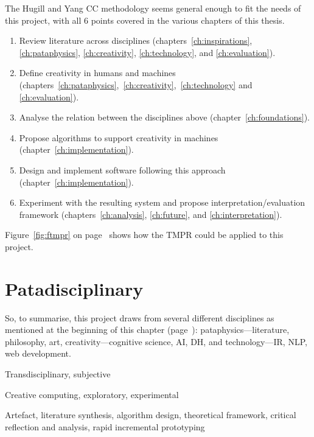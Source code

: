 The Hugill and Yang \ac{CC} methodology seems general enough to fit the needs of this project, with all 6 points covered in the various chapters of this thesis.

\begin{enumerate}
  \item Review literature across disciplines (chapters~\ref{ch:inspirations}, \ref{ch:pataphysics}, \ref{ch:creativity}, \ref{ch:technology}, and \ref{ch:evaluation}).
  \item Define creativity in humans and machines (chapters~\ref{ch:pataphysics},~\ref{ch:creativity},~\ref{ch:technology} and \ref{ch:evaluation}).
  \item Analyse the relation between the disciplines above (chapter~\ref{ch:foundations}).
  \item Propose algorithms to support creativity in machines (chapter~\ref{ch:implementation}).
  \item Design and implement software following this approach (chapter~\ref{ch:implementation}).
  \item Experiment with the resulting system and propose interpretation/evaluation framework (chapters~\ref{ch:analysis}, \ref{ch:future}, and \ref{ch:interpretation}).
\end{enumerate}

Figure~\ref{fig:ftmpr} on page~\pageref{fig:ftmpr} shows how the \ac{TMPR} could be applied to this project. 


\section{Patadisciplinary}
\label{s:mymeth}

So, to summarise, this project draws from several different disciplines as mentioned at the beginning of this chapter (page~\pageref{ch:methodology}): pataphysics---literature, philosophy, art, creativity---cognitive science, \ac{AI}, \ac{DH}, and technology---\ac{IR}, \ac{NLP}, web development.

\begin{description}[leftmargin=3.2cm]
  \item [Epistemology] Transdisciplinary, subjective
  \item [Methodology] Creative computing, exploratory, experimental
  \item [Methods] Artefact, literature synthesis, algorithm design, theoretical framework, critical reflection and analysis, rapid incremental prototyping
\end{description}

